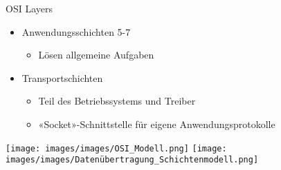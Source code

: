 \begin{definition}{OSI Layers}
    \begin{itemize}
        \item Anwendungsschichten 5-7
        \begin{itemize}
            \item Lösen allgemeine Aufgaben
        \end{itemize}
        \item Transportschichten
        \begin{itemize}
            \item Teil des Betriebssystems und Treiber
            \item «Socket»-Schnittstelle für eigene Anwendungsprotokolle
        \end{itemize}
    \end{itemize}
\end{definition}

\texttt{[image: images/images/OSI\_Modell.png]}
\texttt{[image: images/images/Datenübertragung\_Schichtenmodell.png]}




 
    
 
